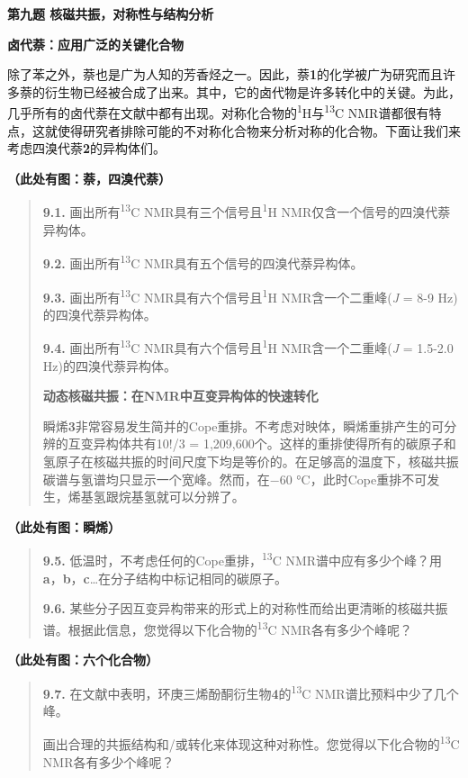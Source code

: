 \textbf{第九题 核磁共振，对称性与结构分析}

\textbf{卤代萘：应用广泛的关键化合物}

除了苯之外，萘也是广为人知的芳香烃之一。因此，萘\textbf{1}的化学被广为研究而且许多萘的衍生物已经被合成了出来。其中，它的卤代物是许多转化中的关键。为此，几乎所有的卤代萘在文献中都有出现。对称化合物的\textsuperscript{1}H与\textsuperscript{13}C
NMR谱都很有特点，这就使得研究者排除可能的不对称化合物来分析对称的化合物。下面让我们来考虑四溴代萘\textbf{2}的异构体们。

\textbf{（此处有图：萘，四溴代萘）}

\begin{quote}
\textbf{9.1.} 画出所有\textsuperscript{13}C
NMR具有三个信号且\textsuperscript{1}H NMR仅含一个信号的四溴代萘异构体。

\textbf{9.2.} 画出所有\textsuperscript{13}C
NMR具有五个信号的四溴代萘异构体。

\textbf{9.3.} 画出所有\textsuperscript{13}C
NMR具有六个信号且\textsuperscript{1}H NMR含一个二重峰(\emph{J} = 8-9
Hz)的四溴代萘异构体。

\textbf{9.4.} 画出所有\textsuperscript{13}C
NMR具有六个信号且\textsuperscript{1}H NMR含一个二重峰(\emph{J} = 1.5-2.0
Hz)的四溴代萘异构体。

\textbf{动态核磁共振：在NMR中互变异构体的快速转化}

瞬烯\textbf{3}非常容易发生简并的Cope重排。不考虑对映体，瞬烯重排产生的可分辨的互变异构体共有10!/3
=
1,209,600个。这样的重排使得所有的碳原子和氢原子在核磁共振的时间尺度下均是等价的。在足够高的温度下，核磁共振碳谱与氢谱均只显示一个宽峰。然而，在−60
°C，此时Cope重排不可发生，烯基氢跟烷基氢就可以分辨了。
\end{quote}

\textbf{（此处有图：瞬烯）}

\begin{quote}
\textbf{9.5.} 低温时，不考虑任何的Cope重排，\textsuperscript{13}C
NMR谱中应有多少个峰？用\textbf{a}，\textbf{b}，\textbf{c}\ldots{}在分子结构中标记相同的碳原子。

\textbf{9.6.}
某些分子因互变异构带来的形式上的对称性而给出更清晰的核磁共振谱。根据此信息，您觉得以下化合物的\textsuperscript{13}C
NMR各有多少个峰呢？
\end{quote}

\textbf{（此处有图：六个化合物）}

\begin{quote}
\textbf{9.7.}
在文献中表明，环庚三烯酚酮衍生物\textbf{4}的\textsuperscript{13}C
NMR谱比预料中少了几个峰。

画出合理的共振结构和/或转化来体现这种对称性。您觉得以下化合物的\textsuperscript{13}C
NMR各有多少个峰呢？
\end{quote}

